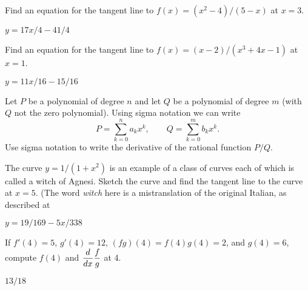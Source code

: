 \begin{exercises}
\begin{exercise} Find an equation for the tangent line to $f(x) = (x^2 -
4)/(5-x)$ at $x= 3$.  
\begin{answer} $y=17x/4-41/4$ 
\end{answer}\end{exercise}

\begin{exercise}  Find an equation for the tangent line to 
$f(x) = (x-2)/(x^3 + 4x - 1)$ at $x=1$.
\begin{answer} $y=11x/16-15/16$
\end{answer}\end{exercise}

\begin{exercise} Let $P$ be a polynomial of degree $n$ and let $Q$ be a
polynomial of degree $m$ (with $Q$ not the zero polynomial). 
Using sigma notation we can write
$$P=\sum _{k=0 } ^n a_k x^k,\qquad
Q=\sum_{k=0}^m b_k x^k.
$$
Use sigma notation to write the derivative of the 
{\dfont rational function}
$P/Q$.
\end{exercise}

\begin{exercise} The curve $y=1/(1+x^2)$ is an example of a class of
curves each of which is called a {\dfont witch of
Agnesi}. 
Sketch the curve and find the tangent line to the curve at
$x= 5$. (The word {\em witch\/} here is a mistranslation of the
original Italian, as described at
\begin{answer} $y=19/169-5x/338$
\end{answer}\end{exercise}
 
\begin{exercise} If $f'(4) = 5$, $g'(4) = 12$, $(fg)(4)= f(4)g(4)=2$, and $g(4) = 6$,
compute $f(4)$ and $\displaystyle{d\over dx}{f\over g}$ at 4.
\begin{answer} $13/18$
\end{answer}\end{exercise}

\end{exercises}
